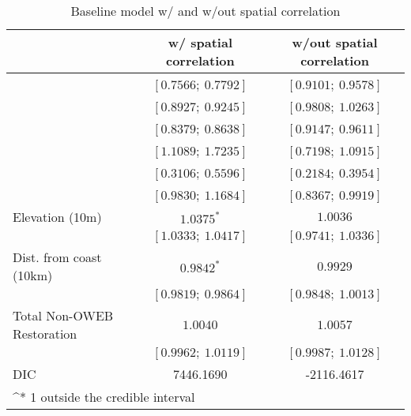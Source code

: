 
\begin{table}
\caption{Baseline model w/ and w/out spatial correlation}
\begin{center}
\begin{tabular}{l c c }
\hline
                           & w/ spatial correlation & w/out spatial correlation \\
\hline
\\%
                           & $[0.7566;\ 0.7792]$ & $[0.9101;\ 0.9578]$ \\
\\%
                           & $[0.8927;\ 0.9245]$ & $[0.9808;\ 1.0263]$ \\
\\%
                           & $[0.8379;\ 0.8638]$ & $[0.9147;\ 0.9611]$ \\
\\%
                           & $[1.1089;\ 1.7235]$ & $[0.7198;\ 1.0915]$ \\
\\%
                           & $[0.3106;\ 0.5596]$ & $[0.2184;\ 0.3954]$ \\
\\%
                           & $[0.9830;\ 1.1684]$ & $[0.8367;\ 0.9919]$ \\
Elevation (10m)            & $1.0375^{*}$        & $1.0036$            \\
                           & $[1.0333;\ 1.0417]$ & $[0.9741;\ 1.0336]$ \\
Dist. from coast (10km)    & $0.9842^{*}$        & $0.9929$            \\
                           & $[0.9819;\ 0.9864]$ & $[0.9848;\ 1.0013]$ \\
Total Non-OWEB Restoration & $1.0040$            & $1.0057$            \\
                           & $[0.9962;\ 1.0119]$ & $[0.9987;\ 1.0128]$ \\
\hline
DIC                        & 7446.1690           & -2116.4617          \\
\hline
\multicolumn{3}{l}{\scriptsize{^* 1 outside the credible interval}}
\end{tabular}
\label{table:basemods}
\end{center}
\end{table}
